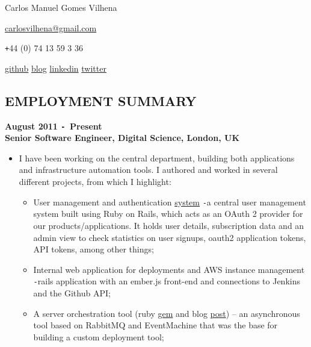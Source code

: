 \documentclass{res}
\def\Plus{\texttt{+}}
\def\Minus{\texttt{-}}
\begin{document}
\thispagestyle{empty}
\centerline{Carlos Manuel Gomes Vilhena}
\vspace{0.1in}
\centerline{\href{mailto:carlosvilhena@gmail.com}{carlosvilhena@gmail.com}}
\centerline{\Plus 44 (0) 74 13 59 3 36}
\centerline{\href{http://github.com/carvil}{github} \hspace{0.5 cm}
\href{http://carvil.github.com/}{blog}  \hspace{0.5 cm}
\href{http://www.linkedin.com/in/carlosvilhena}{linkedin}  \hspace{0.5 cm}
\href{http://www.twitter.com/carvil_}{twitter}
}


\begin{resume}
\vspace{0.1in}


\section{EMPLOYMENT SUMMARY}
\vspace{0.1in}
  {\bf August 2011 \Minus\, Present}\\
  {\bf Senior Software Engineer, Digital Science, London, UK}
    \begin{itemize} %
      \item[] I have been working on the central department, building both
      applications and infrastructure automation tools. I authored and worked
      in several different projects, from which I highlight:
        \begin{itemize}
        \item User management and authentication \href{https://auth.digital-science.com/}{system} \Minus a central user management
        system built using Ruby on Rails, which acts as an OAuth 2 provider for
        our products/applications. It holds user details, subscription data and
        an admin view to check statistics on user signups, oauth2 application
        tokens, API tokens, among other things;
        \item Internal web application for deployments and AWS instance management \Minus rails application with an ember.js front-end and connections to Jenkins and the Github API;
        \item A server orchestration tool (ruby \href{https://rubygems.org/gems/baton}{gem} and blog \href{http://www.digital-science.com/blog/posts/presenting-baton}{post}) – an asynchronous tool based on RabbitMQ and EventMachine that was the base for building a custom deployment tool;

\end{itemize}
\end{itemize}
\end{resume}
\end{document}
